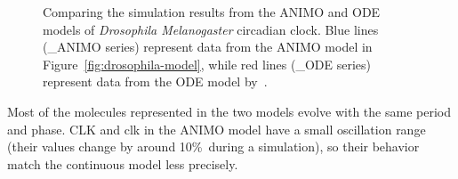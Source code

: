 \documentclass{bmcart}
\begin{document}
\begin{figure}[!htb]
\begin{minipage}{\textwidth}
\begin{tabular}{ccc}
\end{tabular}
\caption{Comparing the simulation results from the ANIMO and ODE models of
\emph{Drosophila Melanogaster} circadian clock. Blue lines ({\sf \_{}ANIMO} series)
represent data from the ANIMO model in Figure~\ref{fig:drosophila-model},
while red lines ({\sf \_{}ODE} series) represent data from the ODE model by~\cite{drosophila-ode-model}.\label{suppl-fig:grafici-drosophila}}
\end{minipage}
\end{figure}

Most of the molecules represented in the two models evolve with the same period and phase.
CLK and clk in the ANIMO model have
a small oscillation range (their values change by around 10\%\ during a simulation),
so their behavior match the continuous model less precisely.
%
%
%
\end{document}
